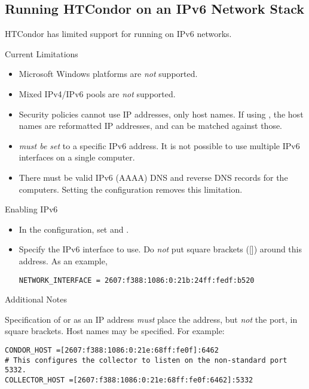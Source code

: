 \subsection{\label{sec:ipv6}Running HTCondor on an IPv6 Network Stack}

HTCondor has limited support for running on IPv6 networks.

Current Limitations

\begin{itemize}
    \item{Microsoft Windows platforms are \emph{not} supported.}
    \item{Mixed IPv4/IPv6 pools are \emph{not} supported.}
    \item{Security policies cannot use IP addresses, only host names.
If using , the host names are reformatted IP addresses,
and can be matched against those. }
    \item{ \emph{must be set} to a 
specific IPv6 address. 
It is not possible to use multiple IPv6 interfaces on a single computer.}
    \item{There must be valid IPv6 (AAAA) DNS and reverse DNS records for 
the computers. 
Setting the configuration  removes this limitation.}
\end{itemize}

Enabling IPv6

\begin{itemize}
    \item{In the configuration, set  
    and .}
    \item{Specify the IPv6 interface to use. 
Do \emph{not} put square brackets ([]) around this address.
As an example,
\begin{verbatim}
NETWORK_INTERFACE = 2607:f388:1086:0:21b:24ff:fedf:b520
\end{verbatim}
}
\end{itemize}

Additional Notes

Specification of   or 
as an IP address \emph{must} place the address, 
but \emph{not} the port, in square brackets. 
Host names may be specified. 
For example:

\begin{verbatim}
CONDOR_HOST =[2607:f388:1086:0:21e:68ff:fe0f]:6462
# This configures the collector to listen on the non-standard port 5332.
COLLECTOR_HOST =[2607:f388:1086:0:21e:68ff:fe0f:6462]:5332
\end{verbatim}

